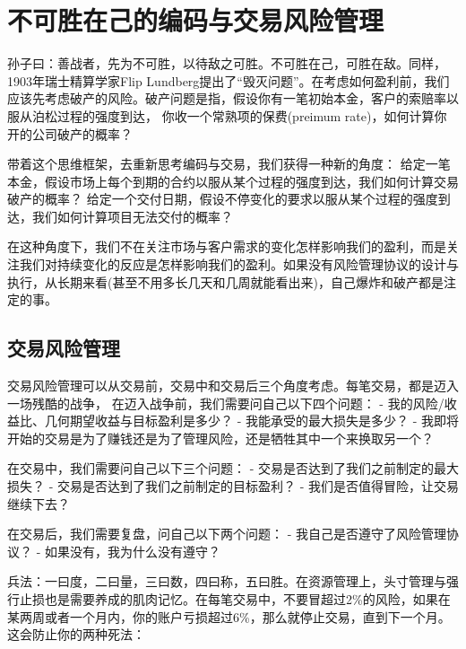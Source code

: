 \documentclass[
  oneside]{book}
\begin{document}
\hypertarget{ux4e0dux53efux80dcux5728ux5df1ux7684ux7f16ux7801ux4e0eux4ea4ux6613ux98ceux9669ux7ba1ux7406}{%
\chapter{不可胜在己的编码与交易风险管理}\label{ux4e0dux53efux80dcux5728ux5df1ux7684ux7f16ux7801ux4e0eux4ea4ux6613ux98ceux9669ux7ba1ux7406}}

孙子曰：善战者，先为不可胜，以待敌之可胜。不可胜在己，可胜在敌。同样，1903年瑞士精算学家Flip Lundberg提出了``毁灭问题''。在考虑如何盈利前，我们应该先考虑破产的风险。破产问题是指，假设你有一笔初始本金，客户的索赔率以服从泊松过程的强度到达，
你收一个常熟项的保费(preimum rate)，如何计算你开的公司破产的概率？

带着这个思维框架，去重新思考编码与交易，我们获得一种新的角度：
给定一笔本金，假设市场上每个到期的合约以服从某个过程的强度到达，我们如何计算交易破产的概率？
给定一个交付日期，假设不停变化的要求以服从某个过程的强度到达，我们如何计算项目无法交付的概率？

在这种角度下，我们不在关注市场与客户需求的变化怎样影响我们的盈利，而是关注我们对持续变化的反应是怎样影响我们的盈利。如果没有风险管理协议的设计与执行，从长期来看(甚至不用多长几天和几周就能看出来)，自己爆炸和破产都是注定的事。

\hypertarget{ux4ea4ux6613ux98ceux9669ux7ba1ux7406}{%
\section{交易风险管理}\label{ux4ea4ux6613ux98ceux9669ux7ba1ux7406}}

交易风险管理可以从交易前，交易中和交易后三个角度考虑。每笔交易，都是迈入一场残酷的战争，
在迈入战争前，我们需要问自己以下四个问题：
- 我的风险/收益比、几何期望收益与目标盈利是多少？
- 我能承受的最大损失是多少？
- 我即将开始的交易是为了赚钱还是为了管理风险，还是牺牲其中一个来换取另一个？

在交易中，我们需要问自己以下三个问题：
- 交易是否达到了我们之前制定的最大损失？
- 交易是否达到了我们之前制定的目标盈利？
- 我们是否值得冒险，让交易继续下去？

在交易后，我们需要复盘，问自己以下两个问题：
- 我自己是否遵守了风险管理协议？
- 如果没有，我为什么没有遵守？

兵法：一曰度，二曰量，三曰数，四曰称，五曰胜。在资源管理上，头寸管理与强行止损也是需要养成的肌肉记忆。在每笔交易中，不要冒超过2\%的风险，如果在某两周或者一个月内，你的账户亏损超过6\%，那么就停止交易，直到下一个月。这会防止你的两种死法：
\end{document}

